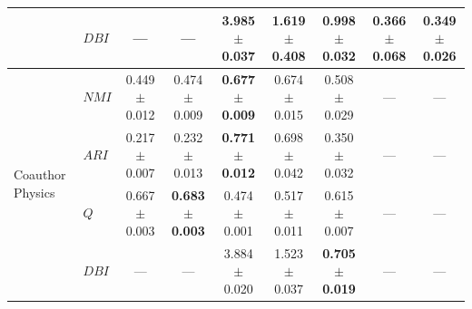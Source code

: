 \documentclass[twoside,twocolumn,10pt]{article}
\begin{document}
\begin{table}[t]
{\begin{tabular}{@{}llccccccc@{}}
 & $DBI$ & --- & --- & 3.985{\scriptsize$\pm$0.037} & 1.619{\scriptsize$\pm$0.408} & 0.998{\scriptsize$\pm$0.032} & 0.366{\scriptsize$\pm$0.068} & \textbf{0.349{\scriptsize$\pm$0.026}} \\
\midrule
\multirow{4}{*}{Coauthor Physics} & $NMI$ & 0.449{\scriptsize$\pm$0.012} & 0.474{\scriptsize$\pm$0.009} & \textbf{0.677{\scriptsize$\pm$0.009}} & 0.674{\scriptsize$\pm$0.015} & 0.508{\scriptsize$\pm$0.029} & --- & --- \\
 & $ARI$ & 0.217{\scriptsize$\pm$0.007} & 0.232{\scriptsize$\pm$0.013} & \textbf{0.771{\scriptsize$\pm$0.012}} & 0.698{\scriptsize$\pm$0.042} & 0.350{\scriptsize$\pm$0.032} & --- & --- \\
 & $Q$ & 0.667{\scriptsize$\pm$0.003} & \textbf{0.683{\scriptsize$\pm$0.003}} & 0.474{\scriptsize$\pm$0.001} & 0.517{\scriptsize$\pm$0.011} & 0.615{\scriptsize$\pm$0.007} & --- & --- \\
 & $DBI$ & --- & --- & 3.884{\scriptsize$\pm$0.020} & 1.523{\scriptsize$\pm$0.037} & \textbf{0.705{\scriptsize$\pm$0.019}} & --- & --- \\
\bottomrule
\end{tabular}}%
\end{table}
\end{document}
